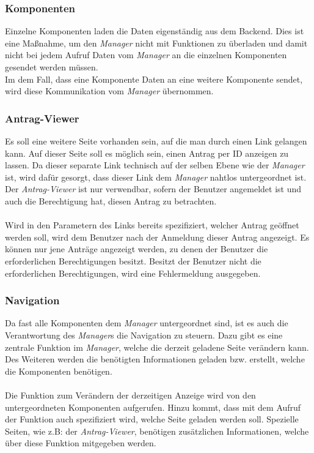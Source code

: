 \subsubsection{Komponenten}
Einzelne Komponenten laden die Daten eigenständig aus dem Backend. Dies ist eine Maßnahme, um den \textit{Manager} nicht mit Funktionen zu überladen und damit nicht bei jedem Aufruf Daten vom \textit{Manager} an die einzelnen Komponenten gesendet werden müssen.\\
Im dem Fall, dass eine Komponente Daten an eine weitere Komponente sendet, wird diese Kommunikation vom \textit{Manager} übernommen.

\subsubsection{Antrag-Viewer}
Es soll eine weitere Seite vorhanden sein, auf die man durch einen Link gelangen kann. Auf dieser Seite soll es möglich sein, einen Antrag per ID anzeigen zu lassen. Da dieser separate Link technisch auf der selben Ebene wie der \textit{Manager} ist, wird dafür gesorgt, dass dieser Link dem \textit{Manager} nahtlos untergeordnet ist. Der \textit{Antrag-Viewer} ist nur verwendbar, sofern der Benutzer angemeldet ist und auch die Berechtigung hat, diesen Antrag zu betrachten.
\\\\
Wird in den Parametern des Links bereits spezifiziert, welcher Antrag geöffnet werden soll, wird dem Benutzer nach der Anmeldung dieser Antrag angezeigt. Es können nur jene Anträge angezeigt werden, zu denen der Benutzer die erforderlichen Berechtigungen besitzt. Besitzt der Benutzer nicht die erforderlichen Berechtigungen, wird eine Fehlermeldung ausgegeben.

\subsubsection{Navigation}
Da fast alle Komponenten dem \textit{Manager} untergeordnet sind, ist es auch die Verantwortung des \textit{Manager}s die Navigation zu steuern. Dazu gibt es eine zentrale Funktion im \textit{Manager}, welche die derzeit geladene Seite verändern kann. Des Weiteren werden die benötigten Informationen geladen bzw. erstellt, welche die Komponenten benötigen.
\\\\
Die Funktion zum Verändern der derzeitigen Anzeige wird von den untergeordneten Komponenten aufgerufen. Hinzu kommt, dass mit dem Aufruf der Funktion auch spezifiziert wird, welche Seite geladen werden soll. Spezielle Seiten, wie z.B: der \textit{Antrag-Viewer}, benötigen zusätzlichen Informationen, welche über diese Funktion mitgegeben werden.

